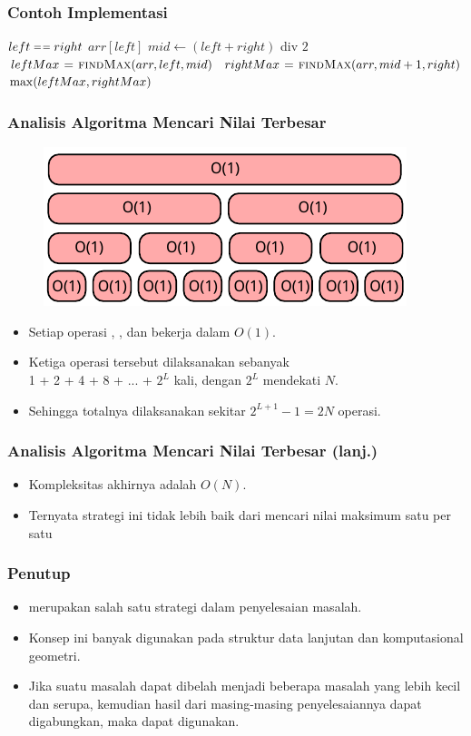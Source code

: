 \begin{frame}
\frametitle{Contoh Implementasi}
\begin{codebox}
\li \If $left \isequal right$ \Then
\li   \Return $arr[left]$
\li \Else
\li   $mid \gets (left + right)$ div $2$
\li   $leftMax \mathrel{\hspace{1pt}=\hspace{1pt}} \textnormal{\scshape findMax}(arr, left, mid)$
\li   $rightMax \mathrel{\hspace{1pt}=\hspace{1pt}} \textnormal{\scshape findMax}(arr, mid+1, right)$
\li   \Return $\func{max}(leftMax, rightMax)$
    \End
\end{codebox}
\end{frame}

\begin{frame}
\frametitle{Analisis Algoritma Mencari Nilai Terbesar}
\begin{figure}
  \centering
  \includegraphics[width=8 cm]{asset/find-max-complexity.pdf}
\end{figure}
\begin{itemize}
  \item Setiap operasi , , dan  bekerja dalam $O(1)$.
  \item Ketiga operasi tersebut dilaksanakan sebanyak\\1 + 2 + 4 + 8 + ... + $2^L$ kali, dengan $2^L$ mendekati $N$.
  \item Sehingga totalnya dilaksanakan sekitar $2^{L+1} - 1 = 2N$ operasi.
\end{itemize}
\end{frame}

\begin{frame}
\frametitle{Analisis Algoritma Mencari Nilai Terbesar (lanj.)}
\begin{itemize}
  \item Kompleksitas akhirnya adalah $O(N)$.
  \item Ternyata strategi ini tidak lebih baik dari mencari nilai maksimum satu per satu
\end{itemize}
\end{frame}

\begin{frame}
\frametitle{Penutup}
\begin{itemize}
  \item \fDivideAndConquer merupakan salah satu strategi dalam penyelesaian masalah.
  \item Konsep ini banyak digunakan pada struktur data lanjutan dan komputasional geometri.
  \item Jika suatu masalah dapat dibelah menjadi beberapa masalah yang lebih kecil dan serupa, kemudian hasil dari masing-masing penyelesaiannya dapat digabungkan, maka \fDivideAndConquer dapat digunakan.
\end{itemize}
\end{frame}


